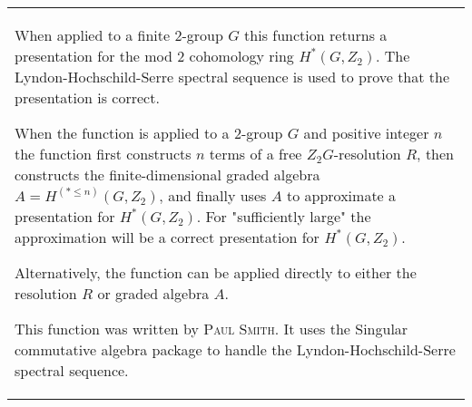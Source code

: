 \documentclass[a4paper,11pt]{report}
\begin{document}
{\begin{center}
\begin{tabular}{|l|}
 When applied to a finite $2$-group $G$ this function returns a presentation for the mod 2 cohomology ring $H^*(G,Z_2)$. The Lyndon-Hochschild-Serre spectral sequence is used to prove that the
presentation is correct. 

 When the function is applied to a $2$-group $G$ and positive integer $n$ the function first constructs $n$ terms of a free $Z_2G$-resolution $R$, then constructs the finite-dimensional graded algebra $A=H^(*\le n)(G,Z_2)$, and finally uses $A$ to approximate a presentation for $H^*(G,Z_2)$. For "sufficiently large" the approximation will be a correct presentation
for $H^*(G,Z_2)$. 

 Alternatively, the function can be applied directly to either the resolution $R$ or graded algebra $A$. 

This function was written by \textsc{Paul Smith}. It uses the Singular commutative algebra package to handle the
Lyndon-Hochschild-Serre spectral sequence. \\
\end{tabular}\\[2mm]
\end{center}

 }

 
\end{document}
